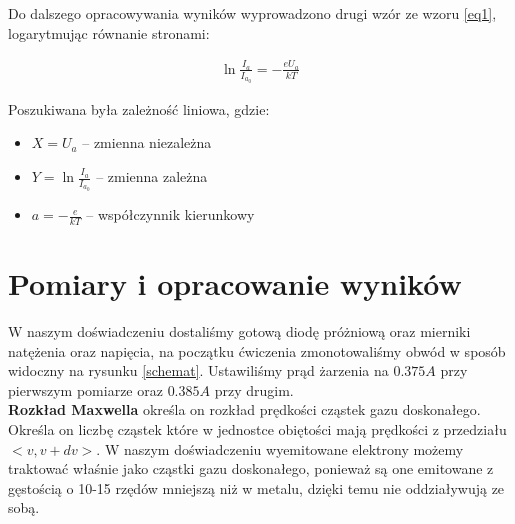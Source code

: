 \documentclass[a4paper]{article}
\begin{document}
Do dalszego opracowywania wyników wyprowadzono drugi wzór ze wzoru \ref{eq1}, logarytmując równanie
stronami:

\begin{align}
	\ln{\frac{I_a}{I_{a_0}}} = -\frac{e U_a}{k T}
\label{eq2}
\end{align}

Poszukiwana była zależność liniowa, gdzie:
\begin{itemize}
\item $X = U_a$ -- zmienna niezależna
\item $Y = \ln \frac{I_a}{I_{a_0}}$ -- zmienna zależna
\item $a = -\frac{e}{kT}$ -- współczynnik kierunkowy
\end{itemize}





\section{Pomiary i opracowanie wyników}
W naszym doświadczeniu dostaliśmy gotową diodę próżniową oraz mierniki natężenia oraz napięcia, na początku ćwiczenia zmonotowaliśmy obwód w sposób widoczny na rysunku \ref{schemat}. Ustawiliśmy prąd żarzenia na $0.375 A$ przy pierwszym pomiarze oraz $0.385 A$ przy drugim. 
\\ \textbf{Rozkład Maxwella} określa on rozkład prędkości cząstek gazu doskonałego. Określa on liczbę cząstek które w jednostce obiętości mają prędkości z przedziału $<v, v + dv>$. W naszym doświadczeniu wyemitowane elektrony możemy traktować właśnie jako cząstki gazu doskonałego, ponieważ są one emitowane z gęstością o 10-15 rzędów mniejszą niż w metalu, dzięki temu nie oddziaływują ze sobą. 
\end{document}
